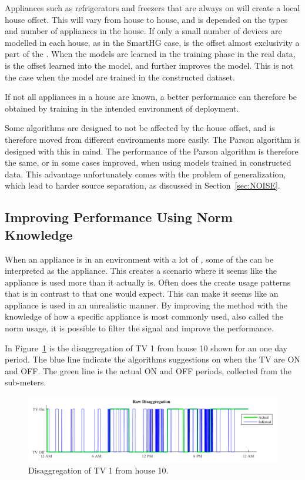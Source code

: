 Appliances such as refrigerators and freezers that are always on will create a local house offset. This will vary from house to house, and is depended on the types and number of appliances in the house. If only a small number of devices are modelled in each house, as in the SmartHG case, is the offset almost exclusivity a part of the . When the models are learned in the training phase in the real data, is the offset learned into the model, and further improves the model. This is not the case when the model are trained in the constructed dataset. 

If not all appliances in a house are known, a better performance can therefore be obtained by training in the intended environment of deployment. 

Some algorithms are designed to not be affected by the house offset, and is therefore moved from different environments more easily. The Parson algorithm is designed with this in mind. The performance of the Parson algorithm is therefore the same, or in some cases improved, when using models trained in constructed data. This advantage unfortunately comes with the problem of generalization, which lead to harder source separation, as discussed in Section~\ref{sec:NOISE}. 

\subsection{Improving Performance Using Norm Knowledge}
\label{sec:NormFilter}
When an appliance is in an environment with a lot of , some of the  can be interpreted as the appliance. This  creates a scenario where it seems like the appliance is used more than it actually is. Often does the  create usage patterns that is in contrast to that one would expect. This can make it seems like an appliance is used in an unrealistic manner. By improving the method with the knowledge of how a specific appliance is most commonly used, also called the norm usage, it is possible to filter the signal and improve the performance. 

In Figure~\ref{fig:Norm1} is the disaggregation of TV 1 from house 10 shown for an one day period. The blue line indicate the  algorithms suggestions on when the TV are ON and OFF. The green line is the actual ON and OFF periods, collected from the sub-meters. 

\begin{figure}[H]
\centering
\includegraphics[width=1\textwidth]{billeder/AppNormFilterH10_1.png}
\caption{Disaggregation of TV 1 from house 10.}
\label{fig:Norm1}
\end{figure}

